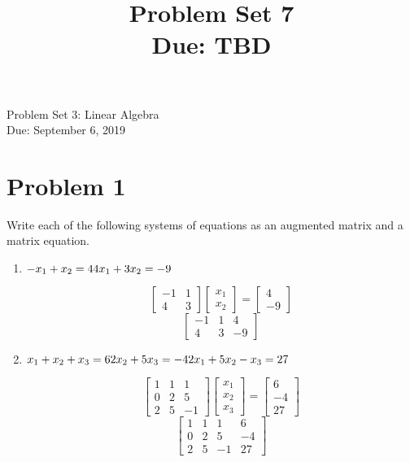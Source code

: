 \documentclass[11pt]{article}
\title{Problem Set 7\\ Due: TBD}%
\theoremstyle{definition}
\theoremstyle{remark}
\begin{document}
\begin{center}
{\huge Problem Set 3: Linear Algebra}\\[5pt]
Due: September 6, 2019
\end{center}

\section*{Problem 1}
Write each of the following systems of equations as an augmented matrix and a matrix equation.
\begin{enumerate}
\item
$
-x_1 + x_2 = 4 \\
4x_1 + 3x_2 = -9 
$

{\color{red}
$$ \begin{bmatrix}-1 & 1 \\ 4 & 3 \end{bmatrix} \begin{bmatrix}x_1 \\ x_2 \end{bmatrix} = \begin{bmatrix} 4 \\ -9 \end{bmatrix}$$
$$ \begin{bmatrix} 
    -1 & 1 & 4 \\ 
     4 & 3 & -9 
    \end{bmatrix} $$
}

\item
$
x_1 + x_2 + x_3 = 6 \\
2x_2 + 5x_3 = -4 \\
2x_1 + 5x_2 -x_3 = 27 \\
$

{\color{red}
$$ \begin{bmatrix} 1 & 1 & 1 \\ 0 & 2 & 5 \\ 2 & 5 & -1 \end{bmatrix} \begin{bmatrix}x_1 \\ x_2 \\ x_3 \end{bmatrix} = \begin{bmatrix} 6 \\ -4 \\ 27 \end{bmatrix}$$
$$ \begin{bmatrix} 
     1 & 1 &  1 &  6 \\ 
     0 & 2 &  5 & -4 \\
     2 & 5 & -1 & 27
    \end{bmatrix} $$
}


\end{enumerate}
\end{document}
